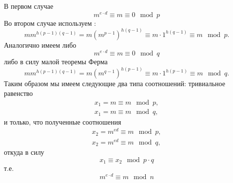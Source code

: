 В первом случае 
\[
m^{e\cdot d} \equiv m \equiv 0 \mod{p}
\]
Во втором случае используем
:
\[
m m^{h \left(p - 1\right)\left(q - 1\right)} 
= m \left(m^{p - 1}\right)^{h \left(q - 1\right)} \equiv m \cdot 1^{h
  \left(q - 1\right)} \equiv m \mod{p}.
\]
Аналогично имеем либо
\[
m^{e\cdot d} \equiv m \equiv 0 \mod{q}
\]
либо в силу малой теоремы Ферма
\[
m m^{h \left(p - 1\right)\left(q - 1\right)} 
= m \left(m^{q - 1}\right)^{h \left(p - 1\right)} \equiv m \cdot 1^{h
  \left(p - 1\right)} \equiv m \mod{q}.
\]
Таким образом мы имеем следующие два типа соотношений:
тривиальное равенство
\begin{eqnarray}
x_1 = m \equiv m \mod p,
\nonumber \\
x_1 = m \equiv m \mod q,
\nonumber
\end{eqnarray}
и только, что полученные соотношения
\begin{eqnarray}
x_2 = m^{ed} \equiv m \mod p,
\nonumber \\
x_2 = m^{ed} \equiv m \mod q,
\nonumber
\end{eqnarray}
откуда в силу 
\[
x_1 \equiv x_2 \mod p \cdot q
\]
т.е.
\[
m^{e\cdot d} \equiv m \mod n
\]
